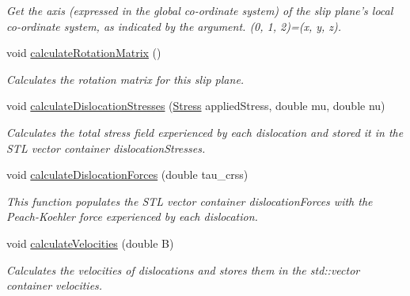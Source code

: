 \begin{DoxyCompactItemize}
\begin{DoxyCompactList}\small\item\em Get the axis (expressed in the global co-\/ordinate system) of the slip plane's local co-\/ordinate system, as indicated by the argument. (0, 1, 2)=(x, y, z). \end{DoxyCompactList}\item 
void \hyperlink{classSlipPlane_a5d9054f21be225f50860ad1351e3a86f}{calculate\-Rotation\-Matrix} ()
\begin{DoxyCompactList}\small\item\em Calculates the rotation matrix for this slip plane. \end{DoxyCompactList}\item 
void \hyperlink{classSlipPlane_a2d4d2d031502d4a6f0aebbad0990b882}{calculate\-Dislocation\-Stresses} (\hyperlink{classStress}{Stress} applied\-Stress, double mu, double nu)
\begin{DoxyCompactList}\small\item\em Calculates the total stress field experienced by each dislocation and stored it in the S\-T\-L vector container dislocation\-Stresses. \end{DoxyCompactList}\item 
void \hyperlink{classSlipPlane_ac16d1abbbc3b938b6f1f29a33a70212d}{calculate\-Dislocation\-Forces} (double tau\-\_\-crss)
\begin{DoxyCompactList}\small\item\em This function populates the S\-T\-L vector container dislocation\-Forces with the Peach-\/\-Koehler force experienced by each dislocation. \end{DoxyCompactList}\item 
void \hyperlink{classSlipPlane_aff7af69ba5235da6c8b142193509683c}{calculate\-Velocities} (double B)
\begin{DoxyCompactList}\small\item\em Calculates the velocities of dislocations and stores them in the std\-::vector container velocities. \end{DoxyCompactList}\end{DoxyCompactItemize}
